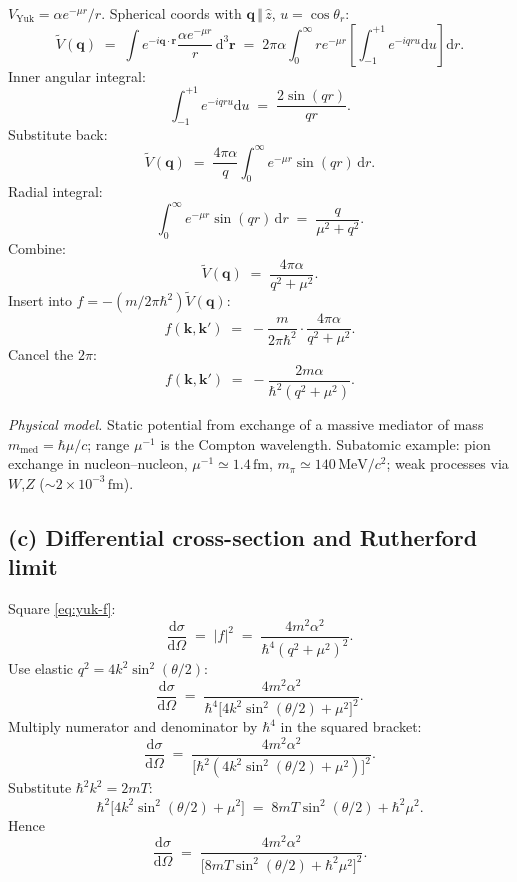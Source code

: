 \documentclass[11pt]{article}
\newcommand{\de}{\mathrm{d}}
\begin{document}
$V_\text{Yuk}=\alpha e^{-\mu r}/r$. Spherical coords with $\bm q\,\Vert\,\hat z$, $u=\cos\theta_r$:
\[
\tilde V(\bm q)\;=\;\int e^{-i\bm q\cdot\bm r}\frac{\alpha e^{-\mu r}}{r}\,\de^{3}\bm r\;=\;2\pi\alpha\int_0^{\infty}r e^{-\mu r}\!\left[\int_{-1}^{+1}e^{-iqru}\de u\right]\de r.
\]
Inner angular integral:
\[
\int_{-1}^{+1}e^{-iqru}\de u\;=\;\frac{2\sin(qr)}{qr}.
\]
Substitute back:
\[
\tilde V(\bm q)\;=\;\frac{4\pi\alpha}{q}\int_0^{\infty}e^{-\mu r}\sin(qr)\,\de r.
\]
Radial integral:
\[
\int_0^{\infty}e^{-\mu r}\sin(qr)\,\de r\;=\;\frac{q}{\mu^{2}+q^{2}}.
\]
Combine:
\[
\tilde V(\bm q)\;=\;\frac{4\pi\alpha}{q^{2}+\mu^{2}}.
\]
Insert into $f=-(m/2\pi\hbar^{2})\tilde V(\bm q)$:
\[
f(\bm k,\bm k')\;=\;-\frac{m}{2\pi\hbar^{2}}\cdot\frac{4\pi\alpha}{q^{2}+\mu^{2}}.
\]
Cancel the $2\pi$:
\begin{equation}
\boxed{\;f(\bm k,\bm k')\;=\;-\frac{2m\alpha}{\hbar^{2}(q^{2}+\mu^{2})}.\;}
\label{eq:yuk-f}
\end{equation}

\emph{Physical model.} Static potential from exchange of a massive mediator of mass $m_\text{med}=\hbar\mu/c$; range $\mu^{-1}$ is the Compton wavelength. Subatomic example: pion exchange in nucleon--nucleon, $\mu^{-1}\simeq 1.4\,\text{fm}$, $m_\pi\simeq 140\,\text{MeV}/c^{2}$; weak processes via $W$,$Z$ ($\sim 2\times10^{-3}\,\text{fm}$).

\subsection*{(c) Differential cross-section and Rutherford limit}

Square \eqref{eq:yuk-f}:
\[
\frac{\de\sigma}{\de\Omega}\;=\;|f|^{2}\;=\;\frac{4m^{2}\alpha^{2}}{\hbar^{4}(q^{2}+\mu^{2})^{2}}.
\]
Use elastic $q^{2}=4k^{2}\sin^{2}(\theta/2)$:
\[
\frac{\de\sigma}{\de\Omega}\;=\;\frac{4m^{2}\alpha^{2}}{\hbar^{4}\bigl[4k^{2}\sin^{2}(\theta/2)+\mu^{2}\bigr]^{2}}.
\]
Multiply numerator and denominator by $\hbar^{4}$ in the squared bracket:
\[
\frac{\de\sigma}{\de\Omega}\;=\;\frac{4m^{2}\alpha^{2}}{\bigl[\hbar^{2}(4k^{2}\sin^{2}(\theta/2)+\mu^{2})\bigr]^{2}}.
\]
Substitute $\hbar^{2}k^{2}=2mT$:
\[
\hbar^{2}\bigl[4k^{2}\sin^{2}(\theta/2)+\mu^{2}\bigr]\;=\;8mT\sin^{2}(\theta/2)+\hbar^{2}\mu^{2}.
\]
Hence
\begin{equation}
\boxed{\;\frac{\de\sigma}{\de\Omega}\;=\;\frac{4m^{2}\alpha^{2}}{\bigl[8mT\sin^{2}(\theta/2)+\hbar^{2}\mu^{2}\bigr]^{2}}.\;}
\label{eq:yuk-final}
\end{equation}
\end{document}
